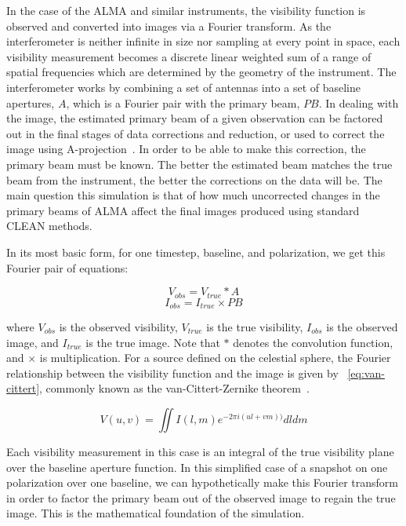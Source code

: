 \documentclass[11pt]{article}
\begin{document}
In the case of the ALMA and similar instruments, the visibility function is 
observed and converted into images
via a Fourier transform. As the interferometer is neither infinite in size nor 
sampling at every point in space, each visibility measurement becomes a 
discrete linear weighted sum of a range of spatial frequencies which are 
determined by the geometry of the instrument. The interferometer works by 
combining a set of
antennas into a set of baseline apertures, $A$, which is a Fourier pair with
the primary beam, $PB$. In dealing with the image, the estimated
primary beam of a given observation can be factored out in the final stages of
data corrections and reduction, or used to correct the image using 
A-projection~\cite{bhatnager}.  In order to be able to make this correction, 
the primary beam must be known.
The better the estimated beam matches the true beam from the instrument,
the better the corrections on the data will be. The main question this 
simulation is that of how much uncorrected changes in the primary beams of ALMA 
affect the final images produced using standard CLEAN methods.

In its most basic form, for one timestep, baseline, and polarization, we get 
this Fourier pair of equations:

\begin{equation}
    \label{eq:vis}
    V_{obs} = V_{true} * A
\end{equation}
\begin{equation}
    \label{eq:im}
    I_{obs} = I_{true} \times PB
\end{equation}

where $V_{obs}$ is the observed visibility, $V_{true}$ is the true visibility, 
$I_{obs}$ is the observed image, and $I_{true}$ is the true image. Note that 
$*$ denotes the convolution function, and $\times$ is multiplication.  For a 
source defined on the celestial sphere, the Fourier relationship between the 
visibility function and the image is given by ~\eqref{eq:van-cittert}, commonly 
known as the van-Cittert-Zernike theorem~\cite{tms}.

\begin{equation}
    \label{eq:van-cittert}
    V(u,v) = \iint I(l,m) e^{-2 \pi i (ul + vm))} dl dm
\end{equation}

Each visibility measurement in this case is an integral of the true visibility 
plane over the baseline aperture function. In this simplified case of a 
snapshot on one polarization over one baseline, we can hypothetically make this 
Fourier transform in order to factor the primary beam out of the observed image 
to regain the true image. This is the mathematical foundation of the 
simulation.
\end{document}
